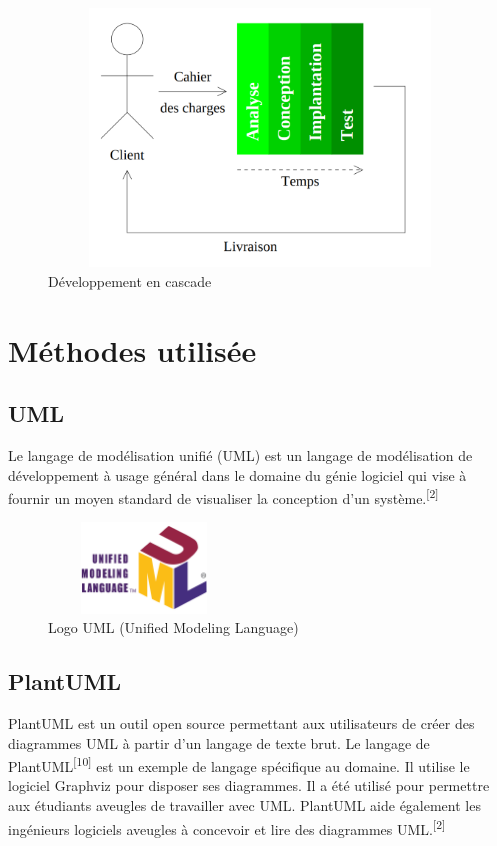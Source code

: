 \documentclass[12pt]{report}
\begin{document}
\begin{figure}[h]
\centering
    \includegraphics[width = 5in, height = 2.7in]{../Images/Analyse_Conception.png}
\caption{Développement en cascade}
\end{figure}

\newpage

\section{Méthodes utilisée}

\subsection{UML}
Le langage de modélisation unifié (UML) est un langage de modélisation de développement à usage général dans le domaine du génie logiciel qui vise à fournir un moyen standard de visualiser la conception d'un système.\textsuperscript{[2]}

\begin{figure}[h]
\centering
    \includegraphics[width = 2in, height = 0.95in]{../Images/UMLlogo.png}
  \caption{Logo UML (Unified Modeling Language)}
\end{figure}

\vspace*{-0.3in}

\subsection{PlantUML}
PlantUML est un outil open source permettant aux utilisateurs de cr\'eer des diagrammes UML \`a partir d'un langage de texte brut. Le langage de PlantUML\textsuperscript{[10]} est un exemple de langage sp\'ecifique au domaine. Il utilise le logiciel Graphviz pour disposer ses diagrammes. Il a \'et\'e utilis\'e pour permettre aux \'etudiants aveugles de travailler avec UML\@. PlantUML aide \'egalement les ing\'enieurs logiciels aveugles \`a concevoir et lire des diagrammes UML\@.\textsuperscript{[2]}
\end{document}
